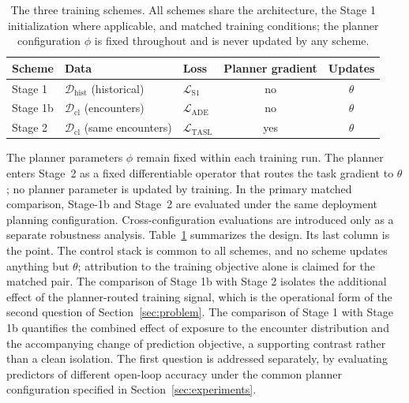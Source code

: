 \documentclass[11pt]{article}
\theoremstyle{plain}
\theoremstyle{definition}
\begin{document}
\begin{table}[t]
	\centering
	\caption{The three training schemes. All schemes share the
		architecture, the Stage 1 initialization where applicable, and
		matched training conditions; the planner configuration $\phi$ is
		fixed throughout and is never updated by any scheme.}
	\label{tab:training-schemes}
	\begin{tabular}{lllcc}
		\hline
		Scheme   & Data & Loss & Planner gradient & Updates \\
		\hline
		Stage 1  & $\mathcal{D}_{\mathrm{hist}}$ (historical)
		         & $\mathcal{L}_{\mathrm{S1}}$   & no  & $\theta$ \\
		Stage 1b & $\mathcal{D}_{\mathrm{cl}}$ (encounters)
		         & $\mathcal{L}_{\mathrm{ADE}}$  & no  & $\theta$ \\
		Stage 2  & $\mathcal{D}_{\mathrm{cl}}$ (same encounters)
		         & $\mathcal{L}_{\mathrm{TASL}}$ & yes & $\theta$ \\
		\hline
	\end{tabular}
\end{table}
 
The planner parameters $\phi$ remain fixed within each training run.
The planner enters Stage~2 as a fixed differentiable operator that
routes the task gradient to $\theta$; no planner parameter is updated
by training. In the primary matched comparison, Stage-1b and Stage~2
are evaluated under the same deployment planning configuration.
Cross-configuration evaluations are introduced only as a separate
robustness analysis. Table~\ref{tab:training-schemes}
summarizes the design. Its last column is the point. The control stack is common to all
schemes, and no scheme updates anything but $\theta$; attribution to
the training objective alone is claimed for the matched pair. The
comparison of Stage 1b with Stage 2 isolates the additional effect of
the planner-routed training signal, which is the operational form of
the second question of Section~\ref{sec:problem}. The comparison of
Stage 1 with Stage 1b quantifies the combined effect of exposure to
the encounter distribution and the accompanying change of prediction
objective, a supporting contrast rather than a clean isolation. The
first question is addressed separately, by evaluating predictors of
different open-loop accuracy under the common planner configuration
specified in Section~\ref{sec:experiments}.
 
\end{document}
